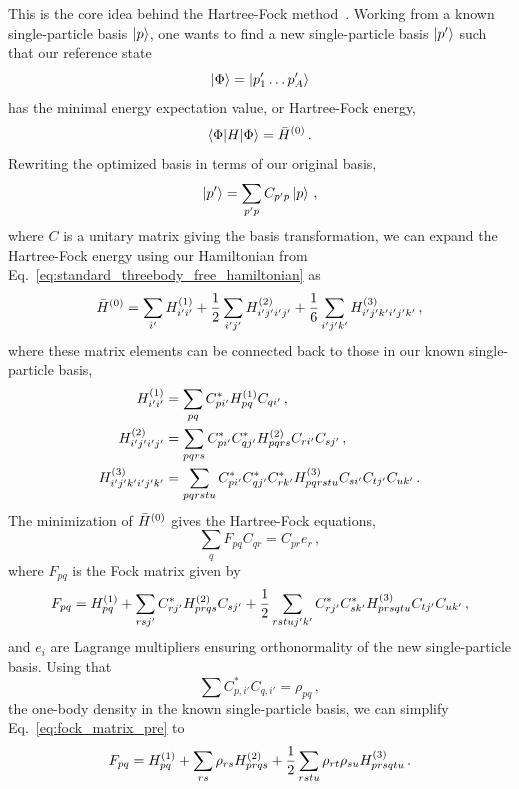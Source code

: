 This is the core idea behind the Hartree-Fock method~\cite{Slat28hf,Fock30hf,Hart28hf}.
Working from a known single-particle basis $\ket{p}$,
one wants to find a new single-particle basis $\ket{p'}$
such that our reference state
\begin{equation}
  \ket{\Phi} = \ket{p_{1}^{\prime} \ldots p_{A}^{\prime}}
\end{equation}
has the minimal energy expectation value, or Hartree-Fock energy,
\begin{equation}
  \braket{\Phi | H | \Phi} = {\bar{H}}^{(0)}\,.
\end{equation}
Rewriting the optimized basis in terms of our original basis,
\begin{equation}
  \ket{p'} = \sum_{p'p}C_{p'p} \ket{p}\,,
\end{equation}
where $C$ is a unitary matrix giving the basis transformation,
we can expand the Hartree-Fock energy
using our Hamiltonian from Eq.~\ref{eq:standard_threebody_free_hamiltonian} as
\begin{equation}
  {\bar{H}}^{(0)} = \sum_{i'} {H}^{(1)}_{i'i'} + \frac{1}{2}\sum_{i'j'} {H}^{(2)}_{i'j'i'j'}
  + \frac{1}{6}\sum_{i'j'k'} {H}^{(3)}_{i'j'k'i'j'k'}\,,
\end{equation}
where these matrix elements can be connected back to those in our known single-particle basis,
\begin{align}
  {H}^{(1)}_{i'i'} &= \sum_{pq} C_{pi'}^{*} {H}^{(1)}_{pq} C_{q i'}\,,\\
  {H}^{(2)}_{i'j'i'j'} &= \sum_{pqrs} C_{pi'}^{*}C_{qj'}^{*} {H}^{(2)}_{pqrs} C_{r i'}C_{s j'}\,,\\
  {H}^{(3)}_{i'j'k'i'j'k'} &= \sum_{pqrstu} C_{pi'}^{*}C_{qj'}^{*}C_{rk'}^{*} {H}^{(3)}_{pqrstu} C_{s i'}C_{t j'}C_{u k'}\,.
\end{align}
The minimization of ${\bar{H}}^{(0)}$ gives the Hartree-Fock equations,
\begin{equation}
  \sum_{q} F_{pq} C_{qr} = C_{pr} e_{r}\,,
\end{equation}
where $F_{pq}$ is the Fock matrix given by
\begin{equation}\label{eq:fock_matrix_pre}
  F_{pq} = {H}^{(1)}_{pq} + \sum_{rsj'} C_{rj'}^{*} {H}^{(2)}_{prqs} C_{s j'} + \frac{1}{2}\sum_{rstu j'k'} C_{rj'}^{*}C_{sk'}^{*} {H}^{(3)}_{prsqtu} C_{t j'}C_{u k'}\,,
\end{equation}
and $e_i$ are Lagrange multipliers
ensuring orthonormality of the new single-particle basis.
Using that
\begin{equation}\label{eq:hf_density_update}
  \sum C_{p, i'}^{*} C_{q, i'} = \rho_{pq}\,,
\end{equation}
the one-body density in the known single-particle basis,
we can simplify Eq.~\ref{eq:fock_matrix_pre} to
\begin{equation}\label{eq:fock_matrix}
  F_{pq} = {H}^{(1)}_{pq} + \sum_{rs} \rho_{rs} {H}^{(2)}_{prqs} + \frac{1}{2}\sum_{rstu}\rho_{rt} \rho_{su} {H}^{(3)}_{prsqtu}\,.
\end{equation}

